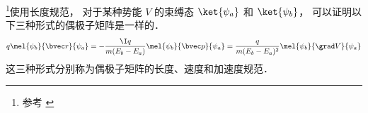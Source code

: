 

\footnote{参考 \cite{Brandsen}}使用长度规范， 对于某种势能 $V$ 的束缚态 $\ket{\psi_a}$ 和 $\ket{\psi_b}$， 可以证明以下三种形式的偶极子矩阵是一样的．
\begin{equation}
q\mel{\psi_b}{\bvec r}{\psi_a} = -\frac{\I q}{m(E_b - E_a)}\mel{\psi_b}{\bvec p}{\psi_a} = \frac{q}{m(E_b-E_a)^2} \mel{\psi_b}{\grad V}{\psi_a}
\end{equation}
这三种形式分别称为偶极子矩阵的长度、速度和加速度规范．
